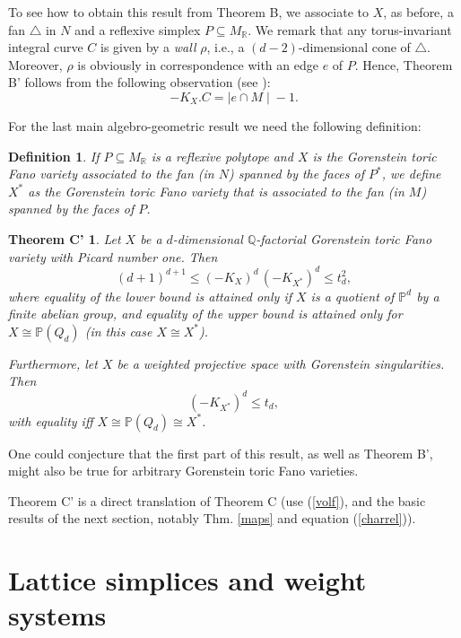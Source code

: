 \documentclass[a4paper,twoside]{article}
\newcommand{\card}[1]{{\mid\! #1 \!\mid}}
\def\P{{\mathbb P}}
\def\Q{{\mathbb Q}}
\def\R{{\mathbb R}}
\def\MR{{M_{\R}}}
\def\fan{\triangle}
\def\KX{{K_X}}
\newtheorem*{theoremCs*}{Theorem C'}
\newtheorem{definition}[theorem]{Definition}
\begin{document}
\smallskip

To see how to obtain this result from Theorem B, we associate to $X$, as before, a fan $\fan$ in $N$ and a reflexive simplex $P \subseteq \MR$. 
We remark that any torus-invariant integral curve $C$ is given by a {\em wall} $\rho$, 
i.e., a $(d-2)$-dimensional cone of $\fan$. Moreover, $\rho$ is obviously in correspondence with an edge $e$ of $P$. 
Hence, Theorem B' follows from the following observation (see \cite[Cor. 3.6]{Lat96}):
\begin{equation}
-\KX.C = \card{e \cap M} - 1.
\label{edgesf}
\end{equation}

\smallskip

For the last main algebro-geometric result we need the following definition:

\begin{definition}{\rm 
If $P \subseteq \MR$ is a reflexive polytope and $X$ is the Gorenstein toric Fano variety associated to the fan (in $N$) spanned by the faces of $P^*$, 
we define $X^*$ as the Gorenstein toric Fano variety that 
is associated to the fan (in $M$) spanned by the faces of $P$.
}
\end{definition}

\begin{theoremCs*}
Let $X$ be a $d$-dimensional $\Q$-factorial Gorenstein toric Fano variety with Picard number one. Then
\[(d+1)^{d+1} \leq (-K_X)^d \, (-K_{X^*})^d \leq t^2_d,\]
where equality of the lower bound is attained only if $X$ is a quotient of $\P^d$ by a finite abelian group, and 
equality of the upper bound is attained only for $X \cong \P(Q_d)$ (in this case $X \cong X^*$).

\smallskip
Furthermore, let $X$ be a weighted projective space with Gorenstein singularities. Then
\[(-K_{X^*})^d \leq t_d,\]
with equality iff $X \cong \P(Q_d) \cong X^*$.
\label{theC}
\end{theoremCs*}

One could conjecture that the first part of this result, as well as Theorem B', might also be true for arbitrary Gorenstein toric Fano varieties.

\smallskip

Theorem C' is a direct translation of Theorem C (use (\ref{volf}), and the 
basic results of the next section, notably Thm. \ref{maps} and equation (\ref{charrel})).

\section{Lattice simplices and weight systems}
\end{document}
